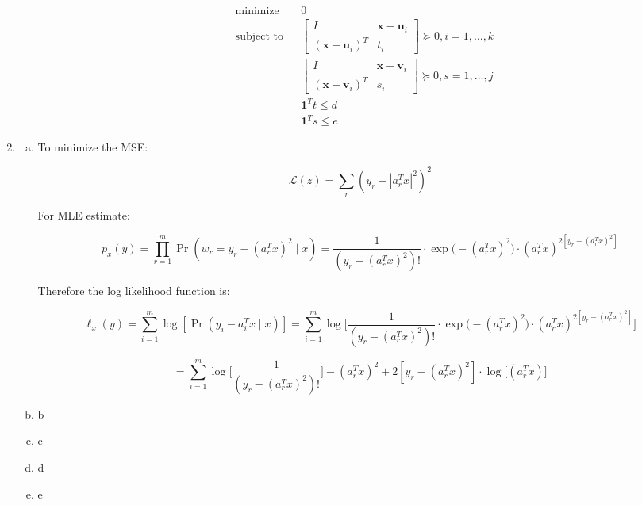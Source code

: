 \begin{enumerate}[(1)]
\begin{enumerate}[(a)]
\[
\boxed{
\begin{aligned}
& {\text{minimize}}
& & 0 \\
& \text{subject to}
& & \begin{bmatrix}
    I      & \boldsymbol{x} - \boldsymbol{u}_i\\
    (\boldsymbol{x} - \boldsymbol{u}_i)^T & t_i
\end{bmatrix} \succeq 0  , i = 1, \ldots, k \\
& & & \begin{bmatrix}
    I      & \boldsymbol{x} - \boldsymbol{v}_i\\
    (\boldsymbol{x} - \boldsymbol{v}_i)^T & s_i
\end{bmatrix} \succeq 0 , s = 1, \ldots, j \\
& & & \boldsymbol{1}^T t \leq d \\
& & & \boldsymbol{1}^T s \leq e
\end{aligned}}
\]

\end{enumerate}


\item

\begin{enumerate}[(a)]

\item To minimize the MSE:

\[
\mathcal{L}(z) = \sum_{r} (y_r - | a_r^T x|^2)^2 
\]

For MLE estimate:

\[
p_x(y) = \prod_{r=1}^m \Pr(w_r = y_r - (a_r^Tx)^2 \mid x) = \frac{1}{(y_r - (a_r^Tx)^2)!} \cdot \exp\big(-(a_r^Tx)^2 \big) \cdot (a_r^Tx)^{2 [y_r - (a_r^Tx)^2]}
\]

Therefore the log likelihood function is:

\[
\ell_x (y) = \sum_{i=1}^m \log [ \Pr(y_i - a_i^Tx \mid x)] = \sum_{i=1}^m \log \bigg[ \frac{1}{(y_r - (a_r^Tx)^2)!} \cdot \exp\big(-(a_r^Tx)^2 \big) \cdot (a_r^Tx)^{2[y_r - (a_r^Tx)^2]} \bigg]
\]

\[
= \sum_{i=1}^m  \log \bigg[\frac{1}{(y_r - (a_r^Tx)^2)!} \bigg]-(a_r^Tx)^2 + 2[y_r - (a_r^Tx)^2] \cdot \log \big[ (a_r^Tx) \big] 
\]

\item b
\item c

\item d

\item e

\end{enumerate}

\end{enumerate}

%
%
%
%
%
%
%
%

%